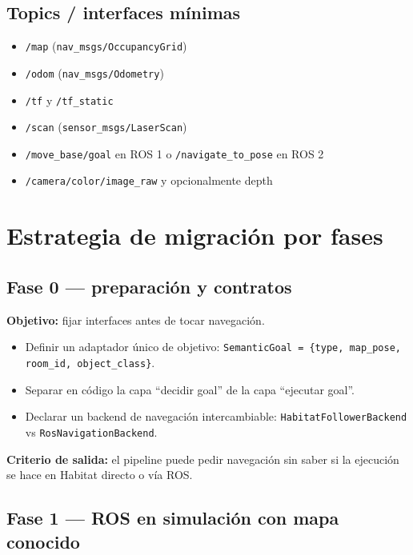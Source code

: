 \documentclass[11pt,a4paper]{article}
\begin{document}
\subsection{Topics / interfaces mínimas}

\begin{itemize}
  \item \texttt{/map} (\texttt{nav\_msgs/OccupancyGrid})
  \item \texttt{/odom} (\texttt{nav\_msgs/Odometry})
  \item \texttt{/tf} y \texttt{/tf\_static}
  \item \texttt{/scan} (\texttt{sensor\_msgs/LaserScan})
  \item \texttt{/move\_base/goal} en ROS 1 o \texttt{/navigate\_to\_pose} en ROS 2
  \item \texttt{/camera/color/image\_raw} y opcionalmente depth
\end{itemize}

\section{Estrategia de migración por fases}

\subsection{Fase 0 --- preparación y contratos}

\textbf{Objetivo:} fijar interfaces antes de tocar navegación.

\begin{itemize}
  \item Definir un adaptador único de objetivo:
        \texttt{SemanticGoal = \{type, map\_pose, room\_id, object\_class\}}.
  \item Separar en código la capa ``decidir goal'' de la capa ``ejecutar goal''.
  \item Declarar un backend de navegación intercambiable:
        \texttt{HabitatFollowerBackend} vs \texttt{RosNavigationBackend}.
\end{itemize}

\textbf{Criterio de salida:} el pipeline puede pedir navegación sin saber si la
ejecución se hace en Habitat directo o vía ROS.

\subsection{Fase 1 --- ROS en simulación con mapa conocido}
\end{document}
